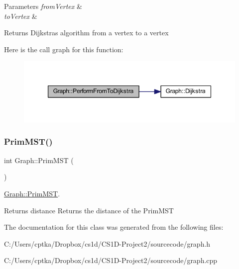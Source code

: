 \begin{DoxyParams}{Parameters}
{\em from\+Vertex} & \\
\hline
{\em to\+Vertex} & \\
\hline
\end{DoxyParams}
\begin{DoxyReturn}{Returns}
Dijkstra\textquotesingle{}s algorithm from a vertex to a vertex 
\end{DoxyReturn}
Here is the call graph for this function\+:
\nopagebreak
\begin{figure}[H]
\begin{center}
\leavevmode
\includegraphics[width=347pt]{class_graph_a3b0a495ac7703b4b7f12dc8e6e490f3b_cgraph}
\end{center}
\end{figure}
\mbox{\label{class_graph_ab4b197d26dfb1a53e14f3e5197053653}} 
\subsubsection{\texorpdfstring{Prim\+M\+S\+T()}{PrimMST()}}
{\footnotesize\ttfamily int Graph\+::\+Prim\+M\+ST (\begin{DoxyParamCaption}{ }\end{DoxyParamCaption})}



\mbox{\hyperlink{class_graph_ab4b197d26dfb1a53e14f3e5197053653}{Graph\+::\+Prim\+M\+ST}}. 

\begin{DoxyReturn}{Returns}
distance Returns the distance of the Prim\+M\+ST 
\end{DoxyReturn}


The documentation for this class was generated from the following files\+:\begin{DoxyCompactItemize}
\item 
C\+:/\+Users/cptka/\+Dropbox/cs1d/\+C\+S1\+D-\/\+Project2/sourcecode/graph.\+h\item 
C\+:/\+Users/cptka/\+Dropbox/cs1d/\+C\+S1\+D-\/\+Project2/sourcecode/graph.\+cpp\end{DoxyCompactItemize}
